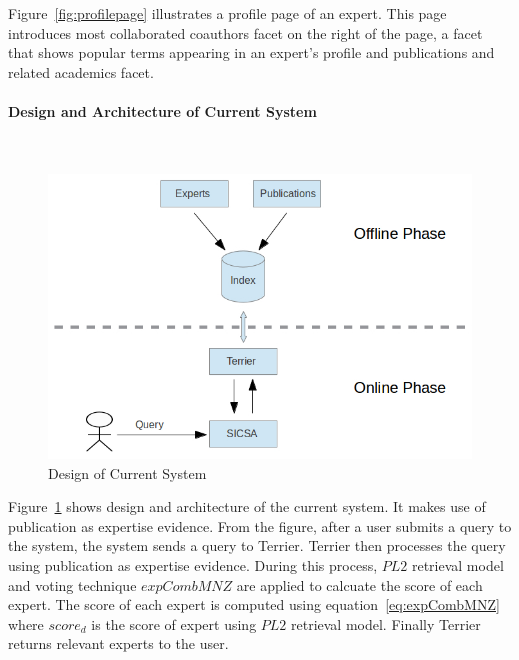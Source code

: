 Figure~\ref{fig:profilepage} illustrates a profile page of an expert. This page introduces most collaborated coauthors facet on the right of the page, a 
facet that shows popular terms appearing in an expert's profile and publications and related academics facet.

\paragraph{Design and Architecture of Current System} \hspace{0pt} \\

 \begin{figure}
 \centering
 \includegraphics[scale=0.5,keepaspectratio]{./figures/currentSystemDesign.jpg}
 \caption{Design of Current System} \label{fig:currentDesign} 
\end{figure}
Figure~\ref{fig:currentDesign} shows design and architecture of the current system. It makes use of publication as expertise evidence. 
From the figure, after a user submits a query to the system, the system sends a query to Terrier. Terrier then processes the query using publication
as expertise evidence. During this process, $PL2$ retrieval model and voting technique $expCombMNZ$ are applied to calcuate the score of each expert.
The score of each expert is computed using equation~\ref{eq:expCombMNZ} where $score_d$ is the score of expert using $PL2$ retrieval model.
Finally Terrier returns relevant experts to the user.

